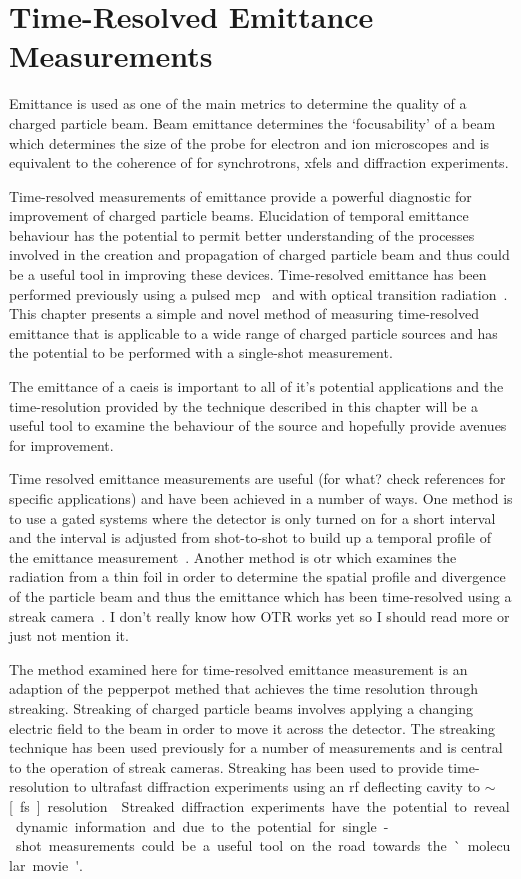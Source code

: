 \chapter{Time-Resolved Emittance Measurements}

Emittance is used as one of the main metrics to determine the quality of a charged particle beam.
Beam emittance determines the `focusability' of a beam which determines the size of the probe for electron and ion microscopes and is equivalent to the coherence of for synchrotrons, \glspl{xfel} and diffraction experiments.

Time-resolved measurements of emittance provide a powerful diagnostic for improvement of charged particle beams.
Elucidation of temporal emittance behaviour has the potential to permit better understanding of the processes involved in the creation and propagation of charged particle beam and thus could be a useful tool in improving these devices.
Time-resolved emittance has been performed previously using a pulsed \gls{mcp}~\cite{yoshida_simple_2001} and with optical transition radiation~\cite{le_sage_time-resolved_2002}.
This chapter presents a simple and novel method of measuring time-resolved emittance that is applicable to a wide range of charged particle sources and has the potential to be performed with a single-shot measurement.

The emittance of a \gls{caeis} is important to all of it's potential applications and the time-resolution provided by the technique described in this chapter will be a useful tool to examine the behaviour of the source and hopefully provide avenues for improvement.

Time resolved emittance measurements are useful {\color{red} (for what? check references for specific applications)} and have been achieved in a number of ways.
One method is to use a gated systems where the detector is only turned on for a short interval and the interval is adjusted from shot-to-shot to build up a temporal profile of the emittance measurement~\cite{bekefi_temporal_1987,yoshida_simple_2001}.
Another method is \gls{otr} which examines the radiation from a thin foil in order to determine the spatial profile and divergence of the particle beam and thus the emittance which has been time-resolved using a streak camera~\cite{fiorito_optical_1994}.
{\color{red}I don't really know how OTR works yet so I should read more or just not mention it.}

The method examined here for time-resolved emittance measurement is an adaption of the pepperpot methed that achieves the time resolution through streaking.
Streaking of charged particle beams involves applying a changing electric field to the beam in order to move it across the detector.
The streaking technique has been used previously for a number of measurements and is central to the operation of streak cameras.
Streaking has been used to provide time-resolution to ultrafast diffraction experiments using an rf deflecting cavity to $\sim$\unit[200][fs] resolution\cite{li_note:_2010}.
Streaked diffraction experiments have the potential to reveal dynamic information and due to the potential for single-shot measurements could be a useful tool on the road towards the `molecular movie'.

